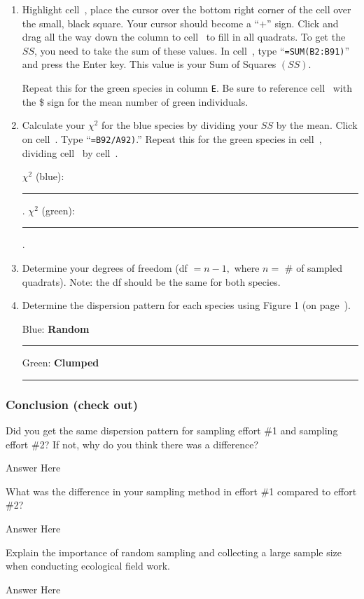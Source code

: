 \documentclass[12pt, hidelinks]{exam}
\newcommand*\AnswerBox[2]{%
    \parbox[t][#1]{0.92\textwidth}{%
    \begin{solution}#2\end{solution}}
    \vspace{\stretch{1}}
}
\newcommand\chisq{$\chi^2$}
\newcommand*\AnswerBlank{\rule{0.75in}{0.4pt}\kern0.67pt.}
\newcommand*\xcell[1]{cell~\liningnum{#1}}
\begin{document}
\begin{questions}
\begin{enumerate}
\item Highlight \xcell{B2}, place the cursor over the bottom right corner of
the cell over the small, black square. Your cursor should become a “$+$”
sign. Click and drag all the way down the column to \xcell{B91} to fill
in all quadrats.  To get the $SS$, you need to take the sum of these
values. In \xcell{B92}, type “\texttt{=SUM(B2:B91)}” and press the Enter key. This value is your Sum of Squares $(SS)$.

Repeat this for the green species in column \texttt{E}. Be sure to reference \xcell{D92} with the \$ sign for the mean number of green individuals.

\item Calculate your \chisq{} for the blue species by dividing your $SS$ by the mean. Click on \xcell{C92}. Type “\texttt{=B92/A92)}.” Repeat this for the green species in \xcell{F92}, dividing \xcell{E92} by \xcell{D92}.

\bigskip

\chisq{} (blue): \AnswerBlank{} \qquad \chisq{} (green): \AnswerBlank{}

\bigskip

\item Determine your degrees of freedom (df $= n-1,$ where $n =$ \# of sampled
quadrats). Note: the df should be the same for both species.

\item Determine the dispersion pattern for each species using Figure 1 (on
page~\pageref{fig:chi_df}).

\bigskip

Blue: \ifprintanswers\textbf{Random}\else\rule{1.5in}{0.4pt}\fi \qquad Green: \ifprintanswers\textbf{Clumped}\else\rule{1.5in}{0.4pt}\fi


\end{enumerate}

\subsubsection*{Conclusion (check out)}

\question
Did you get the same dispersion pattern for sampling effort \#1 and
sampling effort \#2? If not, why do you think there was a difference?

\AnswerBox{3\baselineskip}{%
	Answer Here
}

\question
What was the difference in your sampling method in effort \#1 compared to effort \#2?

\AnswerBox{3\baselineskip}{%
	Answer Here
}

\question
Explain the importance of random sampling and collecting a large
sample size when conducting ecological field work.

\AnswerBox{3\baselineskip}{%
	Answer Here
}

\end{questions}
\end{document}
